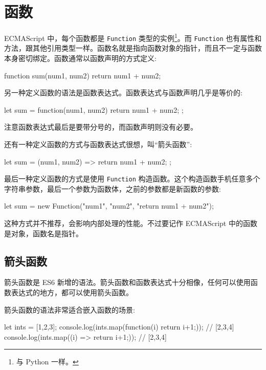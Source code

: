 \section{函数}

ECMAScript 中，每个函数都是 \texttt{Function} 类型的实例\footnote{与 Python 一样。}。而 \texttt{Function} 也有属性和方法，跟其他引用类型一样。函数名就是指向函数对象的指针，而且不一定与函数本身密切绑定。函数通常以函数声明的方式定义:

\begin{JavaScript}
function sum(num1, num2) {
    return num1 + num2;
}
\end{JavaScript}

另一种定义函数的语法是函数表达式。函数表达式与函数声明几乎是等价的:

\begin{JavaScript}
let sum = function(num1, num2) {
    return num1 + num2;
};
\end{JavaScript}

注意函数表达式最后是要带分号的，而函数声明则没有必要。

还有一种定义函数的方式与函数表达式很想，叫``箭头函数'':

\begin{JavaScript}
let sum = (num1, num2) => {
    return num1 + num2;
};
\end{JavaScript}

最后一种定义函数的方式是使用 \texttt{Function} 构造函数。这个构造函数手机任意多个字符串参数，最后一个参数为函数体，之前的参数都是新函数的参数:

\begin{JavaScript}
let sum = new Function("num1", "num2", "return num1 + num2");
\end{JavaScript}

这种方式并不推荐，会影响内部处理的性能。不过要记作 ECMAScript 中的函数是对象，函数名是指针。

\subsection{箭头函数}

箭头函数是 ES6 新增的语法。箭头函数和函数表达式十分相像，任何可以使用函数表达式的地方，都可以使用箭头函数。

箭头函数的语法非常适合嵌入函数的场景:

\begin{JavaScript}
let ints = [1,2,3];
console.log(ints.map(function(i) {return i+1;}));   // [2,3,4]
console.log(ints.map((i) => {return i+1;}));   // [2,3,4]
\end{JavaScript}


